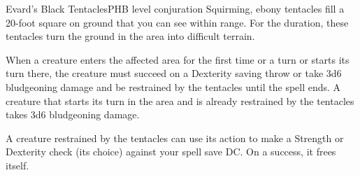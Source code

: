 \begin{spell}{Evard's Black Tentacles}{PHB}{ level conjuration}
{
}
Squirming, ebony tentacles fill a 20-foot square on
ground that you can see within range. For the duration,
these tentacles turn the ground in the area into
difficult terrain.

When a creature enters the affected area for the first
time or a turn or starts its turn there, the creature
must succeed on a Dexterity saving throw or take 3d6
bludgeoning damage and be restrained by the tentacles
until the spell ends. A creature that starts its turn in the
area and is already restrained by the tentacles takes 3d6
bludgeoning damage.

A creature restrained by the tentacles can use its
action to make a Strength or Dexterity check (its choice)
against your spell save DC. On a success, it frees itself.
\end{spell}